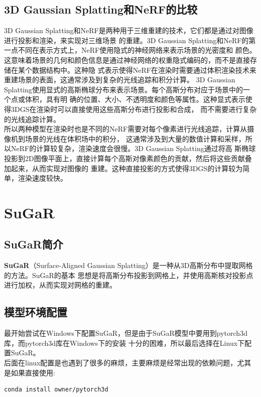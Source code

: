 \documentclass{nwputhesis}
\begin{document}
\subsection{3D Gaussian Splatting和NeRF的比较}
\indent
3D Gaussian Splatting和NeRF是两种用于三维重建的技术，它们都是通过对图像进行投影和渲染，来实现对三维场景
的重建。3D Gaussian Splatting和NeRF的第一点不同在表示方式上，NeRF使用隐式的神经网络来表示场景的光密度和
颜色。这意味着场景的几何和颜色信息是通过神经网络的权重隐式编码的，而不是直接存储在某个数据结构中。这种隐
式表示使得NeRF在渲染时需要通过体积渲染技术来重建场景的表面，这通常涉及到复杂的光线追踪和积分计算。
3D Gaussian Splatting使用显式的高斯椭球分布来表示场景。每个高斯分布对应于场景中的一个点或体积，具有明
确的位置、大小、不透明度和颜色等属性。这种显式表示使得3DGS在渲染时可以直接使用这些高斯分布进行投影和合成，
而不需要进行复杂的光线追踪计算。\\
\indent
所以两种模型在渲染时也是不同的NeRF需要对每个像素进行光线追踪，计算从摄像机到场景的光线在体积场中的积分，
这通常涉及到大量的数值计算和采样，所以NeRF的计算较复杂，渲染速度会很慢。3D Gaussian Splatting通过将高
斯椭球投影到2D图像平面上，直接计算每个高斯对像素颜色的贡献，然后将这些贡献叠加起来，从而实现对图像的
重建。这种直接投影的方式使得3DGS的计算较为简单，渲染速度较快。\\
\makespace
\hypertarget{sugar}{}
\section{SuGaR}
\subsection{SuGaR简介}
\textbf{SuGaR}（Surface-Aligned Gaussian Splatting）是一种从3D高斯分布中提取网格的方法。SuGaR的基本
思想是将高斯分布投影到网格上，并使用高斯核对投影点进行加权，从而实现对网格的重建。
\subsection{模型环境配置}
最开始尝试在Windows下配置SuGaR，但是由于SuGaR模型中要用到pytorch3d库，而pytorch3d库在Windows下的安装
十分的困难，所以最后选择在Linux下配置SuGaR。\\
\indent
后面在linux配置是也遇到了很多的麻烦，主要麻烦是经常出现的依赖问题，尤其是如果直接使用:
\begin{lstlisting}[language=bash]
    conda install owner/pytorch3d
\end{lstlisting}
\end{document}
